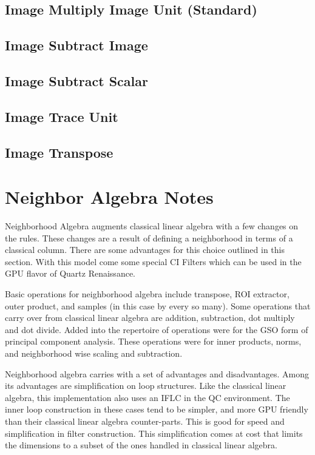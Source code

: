 \documentclass[11pt]{article}
\begin{document}
\subsection{Image Multiply Image Unit (Standard)}

\subsection{Image Subtract Image}

\subsection{Image Subtract Scalar}

\subsection{Image Trace Unit}

\subsection{Image Transpose}


\section{Neighbor Algebra Notes}
Neighborhood Algebra augments classical linear algebra with a few changes on the rules.  These changes are a result of defining a neighborhood in terms of a classical column.  There are some advantages for this choice outlined in this section.  With this model come some special CI Filters which can be used in the GPU flavor of Quartz Renaissance.  

Basic operations for neighborhood algebra include transpose, ROI extractor, outer product, and samples (in this case by every so many).  Some operations that carry over from classical linear algebra are addition, subtraction, dot multiply and dot divide.  Added into the repertoire of operations were for the GSO form of principal component analysis.  These operations were for inner products, norms, and neighborhood wise scaling and subtraction.  

Neighborhood algebra carries with a set of advantages and disadvantages.  Among its advantages are simplification on loop structures.  Like the classical linear algebra, this implementation also uses an IFLC in the QC environment.    The inner loop construction in these cases tend to be simpler, and more GPU friendly than their classical linear algebra counter-parts.  This is good for speed and simplification in filter construction.   This simplification comes at cost that limits the dimensions to a subset of the ones handled in classical linear algebra.  
\end{document}
